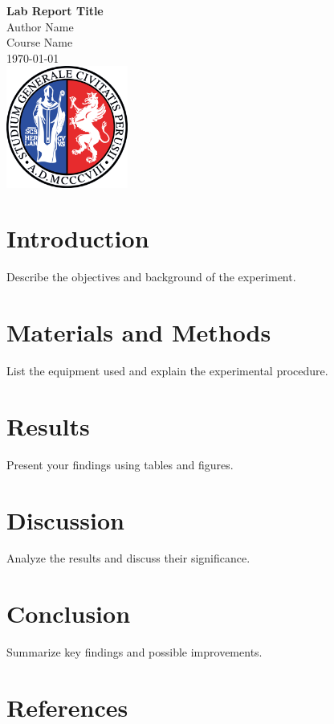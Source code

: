 \documentclass[a4paper,12pt]{article}
\begin{document}
\begin{titlepage}
    \centering
    {\LARGE \textbf{Lab Report Title}}\\[1.5em]
    {\large Author Name}\\[1em]
    {\large Course Name}\\[1em]
    {\large \today}\\[1em]
    \vfill
    \centering
    \includegraphics[width=0.3\textwidth]{Figures/unipg.png}\\[2em] %
    \vfill
\end{titlepage}

\section{Introduction}
Describe the objectives and background of the experiment.

\section{Materials and Methods}
List the equipment used and explain the experimental procedure.

\section{Results}
Present your findings using tables and figures.

\section{Discussion}
Analyze the results and discuss their significance.

\section{Conclusion}
Summarize key findings and possible improvements.

\section*{References}

\end{document}
